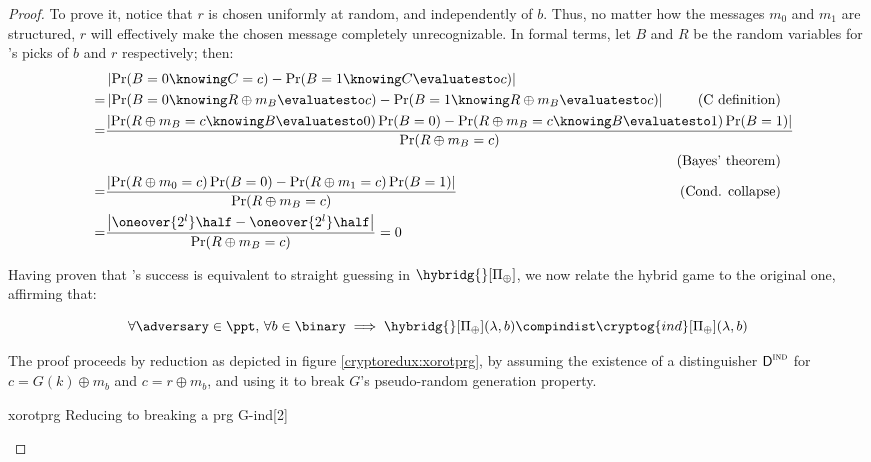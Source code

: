 \begin{proof}
    To prove it, notice that $r$ is chosen uniformly at random, and independently of $b$. Thus, no matter how the messages $m_0$ and $m_1$ are structured, $r$ will effectively make the chosen message completely unrecognizable. In formal terms, let $B$ and $R$ be the random variables for \challenger{}'s picks of $b$ and $r$ respectively; then:
    \begin{align*} %
        & \left| \Pr(B = 0 \knowing C = c) - \Pr(B = 1 \knowing C \evaluatesto c) \right| & \\
        =& \left| \Pr(B = 0 \knowing R \oplus m_B \evaluatesto c) - \Pr(B = 1 \knowing R \oplus m_B \evaluatesto c) \right| & \text{(C definition)} \\
        =& \mathrlap{\frac{\left| \Pr(R \oplus m_B = c \knowing B \evaluatesto 0) \Pr(B = 0) - \Pr(R \oplus m_B = c \knowing B \evaluatesto 1) \Pr(B = 1) \right|}{\Pr(R \oplus m_B = c)}} & \\
        & & \text{(Bayes' theorem)} \\
        =& \frac{\left| \Pr(R \oplus m_0 = c) \Pr(B = 0) - \Pr(R \oplus m_1 = c) \Pr(B = 1) \right|}{\Pr(R \oplus m_B = c)} & \text{(Cond. collapse)} \\
        =& \frac{\left| \oneover{2^l} \half - \oneover{2^l} \half \right|}{\Pr(R \oplus m_B = c)} = 0 & \\
    \end{align*}

    Having proven that \adversary's success is equivalent to straight guessing in $\hybridg{}[\Pi_\oplus]$, we now relate the hybrid game to the original one, affirming that:
    
    \begin{claim}
        \[
            \forall \adversary \in \ppt,\, \forall b \in \binary \implies \hybridg{}[\Pi_\oplus](\lambda, b) \compindist \cryptog{ind}[\Pi_\oplus](\lambda, b) \qedhere
        \]
    \end{claim}

    The proof proceeds by reduction as depicted in figure \ref{cryptoredux:xorotprg}, by assuming the existence of a distinguisher $\textsf{D}^{\textsc{ind}}$ for $c = G(k) \oplus m_{b}$ and $c = r \oplus m_{b}$, and using it to break $G$'s pseudo-random generation property.

    \begin{cryptoredux}
        {xorotprg}
        {Reducing to breaking a \prg}
        {prg}
        {G-ind}[2]


\end{cryptoredux}
\end{proof}
